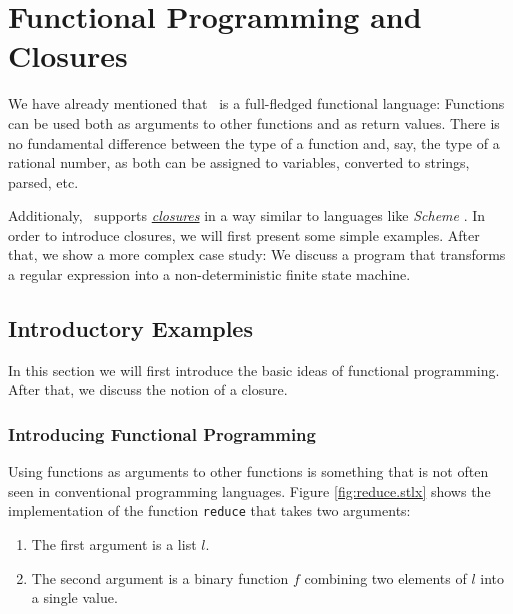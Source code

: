 \chapter{Functional Programming and Closures \label{chapter:closures}}
We have already mentioned that \setlx\ is a full-fledged functional language:
Functions can be used both as arguments to other functions and as return values.  There is
no fundamental difference between the type of a function and, say, the type of a rational
number, as both can be assigned to variables, converted to strings, parsed, etc.

Additionaly, \setlx\ supports
\href{http://en.wikipedia.org/wiki/Closure_(computer_science)}{\emph{closures}}
in a way similar to languages like \textsl{Scheme} \cite{sussman:75}. 
In order to introduce closures, we will first present some simple examples.  After that, we show
a more complex case study: We discuss a program that transforms a regular expression into a
non-deterministic finite state machine.

\section{Introductory Examples}
In this section we will first introduce the basic ideas of functional programming.
After that, we discuss the notion of a closure.

\subsection{Introducing Functional Programming}
Using functions as arguments to other functions is something that is not often seen in
conventional programming languages.  Figure \ref{fig:reduce.stlx} shows the implementation of
the function \texttt{reduce} that takes two arguments:
\begin{enumerate}
\item The first argument is a list $l$.
\item The second argument is a binary function $f$ combining two elements of $l$ into a single value.
\end{enumerate}

